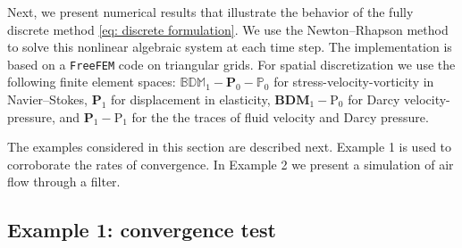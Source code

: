 \documentclass[11pt]{article}
\numberwithin{equation}{section}
\newcommand{\0}{{\mathbf{0}}}
\def\bP{\mathbf{P}}
\newcommand\bbP{\mathbb{P}}
\def\rP{\mathrm{P}}
\def\bBDM{\mathbf{BDM}}
\def\bbBDM{\mathbb{BDM}}
\numberwithin{equation}{section}
\begin{document}
Next, we present numerical results that illustrate the behavior of the fully discrete method \eqref{eq: discrete formulation}. We use the Newton--Rhapson method to solve this nonlinear algebraic system at each time step. 
The implementation is based on a {\tt FreeFEM} code \cite{Hecht} on triangular grids. 
For spatial discretization we use the following finite element spaces: $\bbBDM_1-\bP_0-\bbP_0$ for stress-velocity-vorticity in Navier--Stokes, 
$\bP_1$ for displacement in elasticity,
$\bBDM_1-\rP_0$ for Darcy velocity-pressure, and $\bP_1 - \rP_1$ for the the traces of fluid velocity and Darcy pressure. 

The examples considered in this section are described next.
Example 1 is used to corroborate the rates of convergence. 
In Example 2 we present a simulation of air flow through a filter. 


\subsection{Example 1: convergence test}
\end{document}
